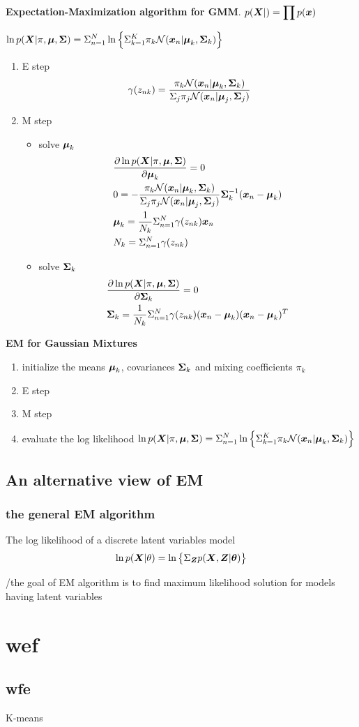 \documentclass[11pt]{article}
\begin{document}
\textbf{Expectation-Maximization algorithm for GMM}. 
\(p(\boldsymbol{X}|)=\displaystyle\prod p(\boldsymbol{x})\)

\(\ln p(\boldsymbol{X}|\pi,\boldsymbol{\mu}, \boldsymbol{\Sigma})=\displaystyle\Sigma_{n=1}^N\ln\left\{
   \displaystyle\Sigma_{k=1}^K\pi_k\mathcal{N}(\boldsymbol{x}_n|\boldsymbol{\mu}_k,\boldsymbol{\Sigma}_k)\right\}\)
\begin{enumerate}
\item E step
\begin{equation*}
\gamma(z_{nk})=\frac{\pi_k\mathcal{N}(\boldsymbol{x}_n|\boldsymbol{\mu}_k,\boldsymbol{\Sigma}_k)}
{\displaystyle\Sigma_j\pi_j\mathcal{N}(\boldsymbol{x}_n|\boldsymbol{\mu}_j,\boldsymbol{\Sigma}_j)}
\end{equation*}
\item M step
\begin{itemize}
\item solve \(\boldsymbol{\mu}_k\)
\begin{align*}
&\frac{\partial\ln p(\boldsymbol{X}|\pi,\boldsymbol{\mu},\boldsymbol{\Sigma})}{\partial\boldsymbol{\mu}_k}=0\\
&0=-\frac{\pi_k\mathcal{N}(\boldsymbol{x}_n|\boldsymbol{\mu}_k,\boldsymbol{\Sigma}_k)}
{\displaystyle\Sigma_j\pi_j\mathcal{N}(\boldsymbol{x}_n|\boldsymbol{\mu}_j,\boldsymbol{\Sigma}_j)}\boldsymbol{\Sigma}_k^{-1}(\boldsymbol{x}_n-\boldsymbol{\mu}_k)\\
&\boldsymbol{\mu}_k=\frac{1}{N_k}\displaystyle\Sigma_{n=1}^N\gamma(z_{nk})\boldsymbol{x}_n\\
&N_k=\displaystyle\Sigma_{n=1}^N\gamma(z_{nk})
\end{align*}
\item solve \(\boldsymbol{\Sigma}_k\)
\begin{align*}
&\frac{\partial\ln p(\boldsymbol{X}|\pi,\boldsymbol{\mu},\boldsymbol{\Sigma})}{\partial\boldsymbol{\Sigma}_k}=0\\
&\boldsymbol{\Sigma}_k=\frac{1}{N_k}\displaystyle\Sigma_{n=1}^N\gamma(z_{nk})(\boldsymbol{x}_n-\boldsymbol{\mu}_k)(\boldsymbol{x}_n-\boldsymbol{\mu}_k)^T
\end{align*}
\end{itemize}
\end{enumerate}


\textbf{EM for Gaussian Mixtures}
\begin{enumerate}
\item initialize the means \(\boldsymbol{\mu}_k\), covariances \(\boldsymbol{\Sigma}_k\) and mixing
coefficients \(\pi_k\)
\item E step
\item M step
\item evaluate the log likelihood
\(\ln p(\boldsymbol{X}|\pi,\boldsymbol{\mu}, \boldsymbol{\Sigma})=\displaystyle\Sigma_{n=1}^N\ln\left\{
      \displaystyle\Sigma_{k=1}^K\pi_k\mathcal{N}(\boldsymbol{x}_n|\boldsymbol{\mu}_k,\boldsymbol{\Sigma}_k)\right\}\)
\end{enumerate}
\subsection{An alternative view of EM}
\label{sec:orgf691c14}
\subsubsection{the general EM algorithm}
\label{sec:orga77f431}
The log likelihood of a discrete latent variables model
\begin{equation*}
\ln p(\boldsymbol{X}|\theta)=\ln\left\{\displaystyle\Sigma_{\boldsymbol{Z}} p(\boldsymbol{X},\boldsymbol{Z}|\boldsymbol{\theta})\right\}
\end{equation*}


/the goal of EM algorithm is to find maximum likelihood solution for models
having latent variables
\section{wef}
\label{sec:orgf781e96}
\subsection{wfe}
\label{sec:orgf7f460d}
K-means
\end{document}
